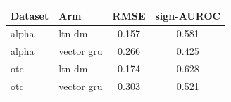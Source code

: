 \begin{tabular}{llcc}
\toprule
Dataset & Arm & RMSE & sign-AUROC \\
\midrule
alpha & ltn dm & 0.157 & 0.581 \\
alpha & vector gru & 0.266 & 0.425 \\
otc & ltn dm & 0.174 & 0.628 \\
otc & vector gru & 0.303 & 0.521 \\
\bottomrule
\end{tabular}
